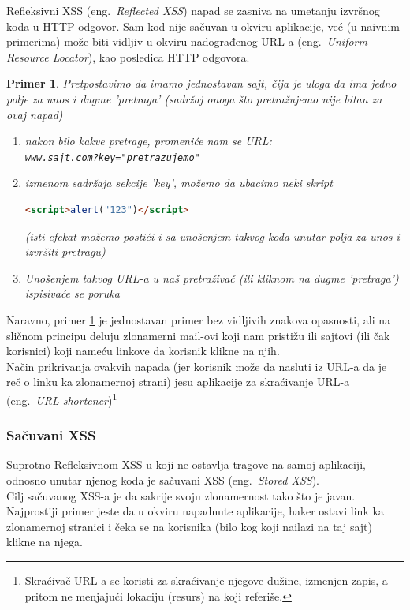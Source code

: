 \documentclass[a4paper]{article}
\newtheorem{primer}{Primer}[section]
\begin{document}
Refleksivni XSS (eng.~{\em Reflected XSS}) napad se zasniva na umetanju izvršnog koda u HTTP odgovor. Sam kod nije sačuvan u okviru aplikacije, već (u naivnim primerima) može biti vidljiv u okviru nadograđenog URL-a (eng.~{\em Uniform Resource Locator}), kao posledica HTTP odgovora.
\begin{primer}
\label{primer1}
Pretpostavimo da imamo jednostavan sajt, čija je uloga da ima jedno polje za unos i dugme 'pretraga' (sadržaj onoga što pretražujemo nije bitan za ovaj napad)
\begin{enumerate}
\item nakon bilo kakve pretrage, promeniće nam se URL:\\
\texttt{www.sajt.com?key="pretrazujemo"}
\item izmenom sadržaja sekcije 'key', možemo da ubacimo neki skript

\begin{lstlisting}[language=HTML]
<script>alert("123")</script>
\end{lstlisting}

(isti efekat možemo postići i sa unošenjem takvog koda unutar polja za unos i izvršiti pretragu)
\item Unošenjem takvog URL-a u naš pretraživač (ili kliknom na dugme 'pretraga') ispisivaće se poruka \\

\end{enumerate}
\end{primer}

 Naravno, primer \ref{primer1} je jednostavan primer bez vidljivih znakova opasnosti, ali na sličnom principu deluju zlonamerni mail-ovi koji nam pristižu ili sajtovi (ili čak korisnici) koji nameću linkove da korisnik klikne na njih.\\
Način prikrivanja ovakvih napada (jer korisnik može da nasluti iz URL-a da je reč o linku ka zlonamernoj strani) jesu aplikacije za skraćivanje URL-a (eng.~{\em URL shortener})\footnote{Skraćivač URL-a se koristi za skraćivanje njegove dužine, izmenjen zapis, a pritom ne menjajući lokaciju (resurs) na koji referiše.}

\subsubsection{Sačuvani XSS}

Suprotno Refleksivnom XSS-u koji ne ostavlja tragove na samoj aplikaciji, odnosno unutar njenog koda je sačuvani XSS (eng.~{\em Stored XSS}).\\ Cilj sačuvanog XSS-a je da sakrije svoju zlonamernost tako što je javan. Najprostiji primer jeste da u okviru napadnute aplikacije, haker ostavi link ka zlonamernoj stranici i čeka se na korisnika (bilo kog koji nailazi na taj sajt) klikne na njega.
\end{document}
